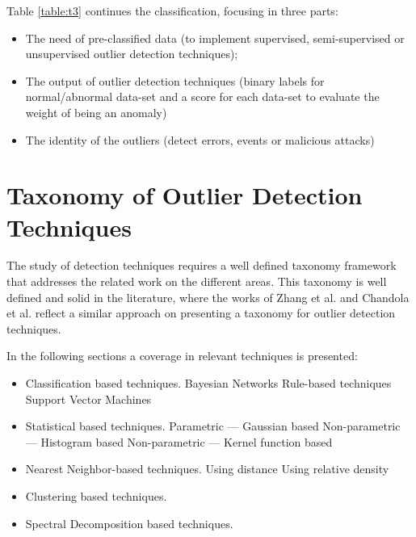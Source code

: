 

\newpage


Table \ref{table:t3} continues the classification, focusing in three parts: 
\begin{itemize}
		\setlength\itemsep{-0.5em}
		\item The need of pre-classified data (to implement supervised, semi-supervised or unsupervised outlier detection techniques);
		
		\item The output of outlier detection techniques (binary labels for normal/abnormal data-set and a score for each data-set to evaluate the weight of being an anomaly)
		
		\item The identity of the outliers (detect errors, events or malicious attacks)
\end{itemize}



\newpage

\section{Taxonomy of Outlier Detection Techniques}

The study of detection techniques requires a well defined taxonomy framework that addresses the related work on the different areas. This taxonomy is well defined and solid in the literature, where the works of Zhang et al. and Chandola et al. reflect a similar approach on presenting a taxonomy for outlier detection techniques.

In the following sections a coverage in relevant techniques is presented:

\begin{itemize}
	\setlength\itemsep{-0.5em}
	\item Classification based techniques.
	\subitem Bayesian Networks
	\subitem Rule-based techniques
	\subitem Support Vector Machines
	
	\item Statistical based techniques.
	\subitem Parametric --- Gaussian based
	\subitem Non-parametric --- Histogram based
	\subitem Non-parametric --- Kernel function based
	
	\item Nearest Neighbor-based techniques.
	\subitem Using distance
	\subitem Using relative density
	
	\item Clustering based techniques.
	
	\item Spectral Decomposition based techniques.
	
\end{itemize}












